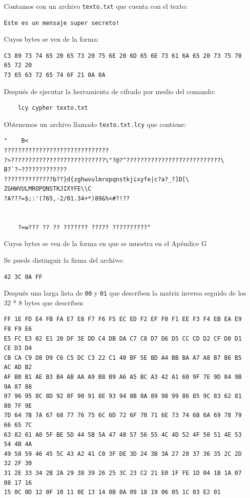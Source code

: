 \documentclass[a4paper]{article}
\begin{document}
Contamos con un archivo \texttt{texto.txt} que cuenta con el texto:

\begin{verbatim}
Este es un mensaje super secreto!

\end{verbatim}

Cuyos bytes se ven de la forma:

\begin{verbatim}
C3 89 73 74 65 20 65 73 20 75 6E 20 6D 65 6E 73 61 6A 65 20 73 75 70 65 72 20
73 65 63 72 65 74 6F 21 0A 0A
\end{verbatim}

Después de ejecutar la herramienta de cifrado por medio del comando:

\begin{verbatim}
    lcy cypher texto.txt
\end{verbatim}

Obtenemos un archivo llamado \texttt{texto.txt.lcy} que contiene:

\begin{verbatim}
"    B<
??????????????????????????????
?>???????????????????????????\"?@?^???????????????????????????\
B?`?~?????????????
??????????????b??}d{zghwvulmropqnstkjixyfe|c?a?_?]D[\
ZGHWVULMROPQNSTKJIXYFE\\C
?A???=$;:'(765,-2/01.34+*)89&%<#?!??


    ?=w??? ?? ?? ??????? ????? ??????????"
\end{verbatim}

Cuyos bytes se ven de la forma en que se muestra en el Apéndice G

Se puede distinguir la firma del archivo:

\begin{verbatim}
42 3C 0A FF 
\end{verbatim}

Después una larga lista de \texttt{00} y \texttt{01} que describen la matriz
inversa seguido de los 32 * 8 bytes que describen 

\begin{verbatim}
FF 1E FD E4 FB FA E7 E8 F7 F6 F5 EC ED F2 EF F0 F1 EE F3 F4 EB EA E9 F8 F9 E6
E5 FC E3 02 E1 20 DF 3E DD C4 DB DA C7 C8 D7 D6 D5 CC CD D2 CF D0 D1 CE D3 D4
CB CA C9 D8 D9 C6 C5 DC C3 22 C1 40 BF 5E BD A4 BB BA A7 A8 B7 B6 B5 AC AD B2
AF B0 B1 AE B3 B4 AB AA A9 B8 B9 A6 A5 BC A3 42 A1 60 9F 7E 9D 84 9B 9A 87 88
97 96 95 8C 8D 92 8F 90 91 8E 93 94 8B 8A 89 98 99 86 85 9C 83 62 81 80 7F 9E
7D 64 7B 7A 67 68 77 76 75 6C 6D 72 6F 70 71 6E 73 74 6B 6A 69 78 79 66 65 7C
63 82 61 A0 5F BE 5D 44 5B 5A 47 48 57 56 55 4C 4D 52 4F 50 51 4E 53 54 4B 4A
49 58 59 46 45 5C 43 A2 41 C0 3F DE 3D 24 3B 3A 27 28 37 36 35 2C 2D 32 2F 30
31 2E 33 34 2B 2A 29 38 39 26 25 3C 23 C2 21 E0 1F FE 1D 04 1B 1A 07 08 17 16
15 0C 0D 12 0F 10 11 0E 13 14 0B 0A 09 18 19 06 05 1C 03 E2 01
\end{verbatim}
\end{document}
